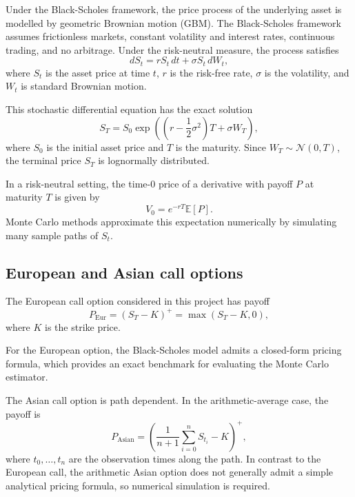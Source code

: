 \documentclass[11pt]{article}
\begin{document}
Under the Black-Scholes framework, the price process of the underlying asset is modelled by geometric Brownian motion (GBM). The Black-Scholes framework assumes frictionless markets, constant volatility and interest rates, continuous trading, and no arbitrage. Under the risk-neutral measure, the process satisfies
\begin{equation}
dS_t = rS_t\,dt + \sigma S_t\,dW_t,
\end{equation}
where $S_t$ is the asset price at time $t$, $r$ is the risk-free rate, $\sigma$ is the volatility, and $W_t$ is standard Brownian motion.

This stochastic differential equation has the exact solution
\begin{equation}
S_T = S_0 \exp\left(\left(r - \frac{1}{2}\sigma^2\right)T + \sigma W_T\right),
\end{equation}
where $S_0$ is the initial asset price and $T$ is the maturity. Since $W_T \sim \mathcal{N}(0,T)$, the terminal price $S_T$ is lognormally distributed.

In a risk-neutral setting, the time-$0$ price of a derivative with payoff $P$ at maturity $T$ is given by
\begin{equation}
V_0 = e^{-rT}\mathbb{E}[P].
\end{equation}
Monte Carlo methods approximate this expectation numerically by simulating many sample paths of $S_t$.

\subsection{European and Asian call options}

The European call option considered in this project has payoff
\begin{equation}
P_{\mathrm{Eur}} = (S_T - K)^+ = \max(S_T - K, 0),
\end{equation}
where $K$ is the strike price.

For the European option, the Black-Scholes model admits a closed-form pricing formula, which provides an exact benchmark for evaluating the Monte Carlo estimator.

The Asian call option is path dependent. In the arithmetic-average case, the payoff is
\begin{equation}
P_{\mathrm{Asian}} = \left(\frac{1}{n+1}\sum_{i=0}^{n} S_{t_i} - K\right)^+,
\end{equation}
where $t_0,\dots,t_n$ are the observation times along the path. In contrast to the European call, the arithmetic Asian option does not generally admit a simple analytical pricing formula, so numerical simulation is required.
\end{document}
